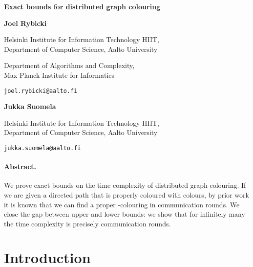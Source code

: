 \documentclass[a4paper,11pt]{article}
\theoremstyle{remark}
\newenvironment{mycover}
               {\list{}{\listparindent 0pt
                        \itemindent    \listparindent
                        \leftmargin    0pt
                        \rightmargin   0pt
                        \parsep        0pt}\raggedright
                \item\relax}
               {\endlist}
\begin{document}

\begin{mycover}
{\LARGE \textbf{Exact bounds for distributed graph colouring}\par}

\bigskip

\medskip
\textbf{Joel Rybicki}\\

\smallskip
{\small Helsinki Institute for Information Technology HIIT, \\
Department of Computer Science, Aalto University

\medskip
Department of Algorithms and Complexity, \\
Max Planck Institute for Informatics

\medskip
\nolinkurl{joel.rybicki@aalto.fi}\par}

\bigskip
\textbf{Jukka Suomela}\\

\smallskip
{\small Helsinki Institute for Information Technology HIIT, \\
Department of Computer Science, Aalto University

\medskip
\nolinkurl{jukka.suomela@aalto.fi}\par}

\end{mycover}

\bigskip

\paragraph{Abstract.}

We prove exact bounds on the time complexity of distributed graph colouring. If we are given a directed path that is properly coloured with  colours, by prior work it is known that we can find a proper -colouring in  communication rounds. We close the gap between upper and lower bounds: we show that for infinitely many  the time complexity is precisely  communication rounds.

\thispagestyle{empty}
\setcounter{page}{0}
\newpage



\section{Introduction}
\end{document}

